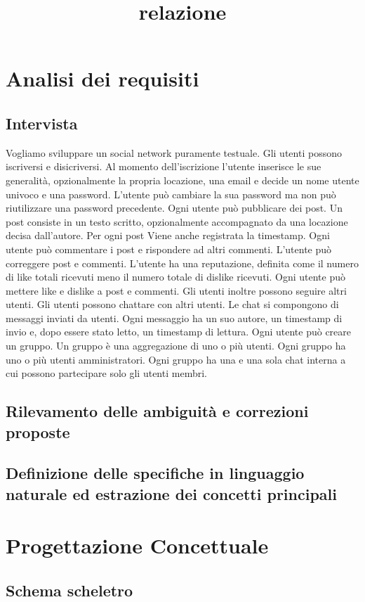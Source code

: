\documentclass[a4paper,12pt]{report}
\begin{document}
\title{relazione}

\chapter{Analisi dei requisiti}
\section{Intervista}
Vogliamo sviluppare un social network puramente testuale.
Gli utenti possono iscriversi e disicriversi. Al momento dell'iscrizione l'utente inserisce le sue generalità, opzionalmente la propria locazione, una email e decide un nome utente univoco e una password.
L'utente può cambiare la sua password ma non può riutilizzare una password precedente.
Ogni utente può pubblicare dei post. Un post consiste in un testo scritto, opzionalmente accompagnato da una locazione decisa dall'autore. 
Per ogni post Viene anche registrata la timestamp.
Ogni utente può commentare i post e rispondere ad altri commenti.
L'utente può correggere post e commenti.
L'utente ha una reputazione, definita come il numero di like totali ricevuti meno il numero totale di dislike ricevuti.
Ogni utente può mettere like e dislike a post e commenti.
Gli utenti inoltre possono seguire altri utenti.
Gli utenti possono chattare con altri utenti. Le chat si compongono di messaggi inviati da utenti. Ogni messaggio ha un suo autore, un timestamp di invio e, dopo essere stato letto, un timestamp di lettura.
Ogni utente può creare un gruppo. Un gruppo è una aggregazione di uno o più utenti. Ogni gruppo ha uno o più utenti amministratori.
Ogni gruppo ha una e una sola chat interna a cui possono partecipare solo gli utenti membri.
\section{Rilevamento delle ambiguità e correzioni proposte}
\section{Definizione delle specifiche in linguaggio naturale ed estrazione dei concetti principali}
\chapter{Progettazione Concettuale}
\section{Schema scheletro}
\end{document}
